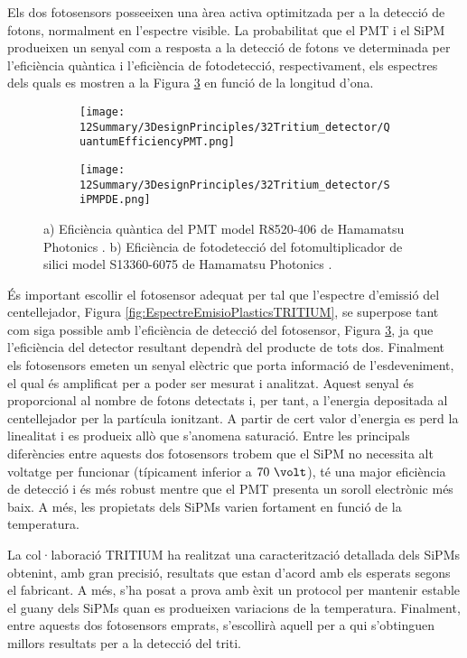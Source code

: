Els dos fotosensors posseeixen una àrea activa optimitzada per a la detecció de fotons, normalment en l'espectre visible. La probabilitat que el PMT i el SiPM produeixen un senyal com a resposta a la detecció de fotons ve determinada per l'eficiència quàntica i l'eficiència de fotodetecció, respectivament, els espectres dels quals es mostren a la Figura \ref{fig:EficienciaFotosensors} en funció de la longitud d'ona. 
\begin{figure}[htpb]
\centering
    \begin{subfigure}[b]{0.55\textwidth}
    \centering
    \texttt{[image: 12Summary/3DesignPrinciples/32Tritium\_detector/QuantumEfficiencyPMT.png]}  
    \caption{\label{subfig:QEPMT}}
    \end{subfigure}
    \hfill
    \begin{subfigure}[b]{0.55\textwidth}
    \centering
    \texttt{[image: 12Summary/3DesignPrinciples/32Tritium\_detector/SiPMPDE.png]}  
    \caption{\label{subfig:PDESiPM}}
    \end{subfigure}
 \caption{a) Eficiència quàntica del PMT model R8520-406 de Hamamatsu Photonics \cite{DataSheetPMTs}. b) Eficiència de fotodetecció del fotomultiplicador de silici model S13360-6075 de Hamamatsu Photonics \cite{DataSheetHammamatsu_1_SiPM_1375}.}
 \label{fig:EficienciaFotosensors}
\end{figure}
És important escollir el fotosensor adequat per tal que l'espectre d'emissió del centellejador, Figura \ref{fig:EspectreEmisioPlasticsTRITIUM}, se superpose tant com siga possible amb l'eficiència de detecció del fotosensor, Figura \ref{fig:EficienciaFotosensors}, ja que l'eficiència del detector resultant dependrà del producte de tots dos. Finalment els fotosensors emeten un senyal elèctric que porta informació de l'esdeveniment, el qual és amplificat per a poder ser mesurat i analitzat. Aquest senyal és proporcional al nombre de fotons detectats i, per tant, a l'energia depositada al centellejador per la partícula ionitzant. A partir de cert valor d'energia es perd la linealitat i es produeix allò que s'anomena saturació. Entre les principals diferències entre aquests dos fotosensors trobem que el SiPM no necessita alt voltatge per funcionar (típicament inferior a $70~\volt$), té una major eficiència de detecció i és més robust mentre que el PMT presenta un soroll electrònic més baix. A més, les propietats dels SiPMs varien fortament en funció de la temperatura.

La col·laboració TRITIUM ha realitzat una caracterització detallada dels SiPMs obtenint, amb gran precisió, resultats que estan d'acord amb els esperats segons el fabricant. A més, s'ha posat a prova amb èxit un protocol per mantenir estable el guany dels SiPMs quan es produeixen variacions de la temperatura. Finalment, entre aquests dos fotosensors emprats, s'escollirà aquell per a qui s'obtinguen millors resultats per a la detecció del triti.